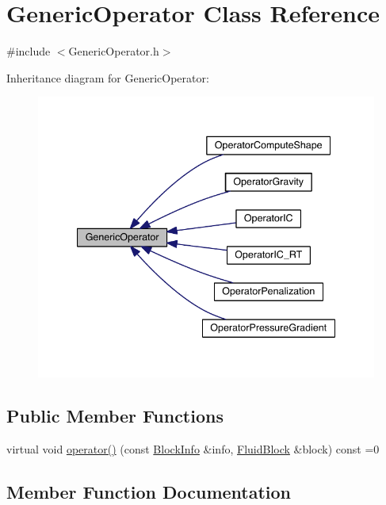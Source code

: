\hypertarget{class_generic_operator}{}\section{Generic\+Operator Class Reference}
\label{class_generic_operator}


{\ttfamily \#include $<$Generic\+Operator.\+h$>$}



Inheritance diagram for Generic\+Operator\+:\nopagebreak
\begin{figure}[H]
\begin{center}
\leavevmode
\includegraphics[width=340pt]{dd/db4/class_generic_operator__inherit__graph}
\end{center}
\end{figure}
\subsection*{Public Member Functions}
\begin{DoxyCompactItemize}
\item 
virtual void \hyperlink{class_generic_operator_aacd69e70a1e2d75b97358fca48689a67}{operator()} (const \hyperlink{struct_block_info}{Block\+Info} \&info, \hyperlink{struct_fluid_block}{Fluid\+Block} \&block) const =0
\end{DoxyCompactItemize}


\subsection{Member Function Documentation}
\hypertarget{class_generic_operator_aacd69e70a1e2d75b97358fca48689a67}{}
